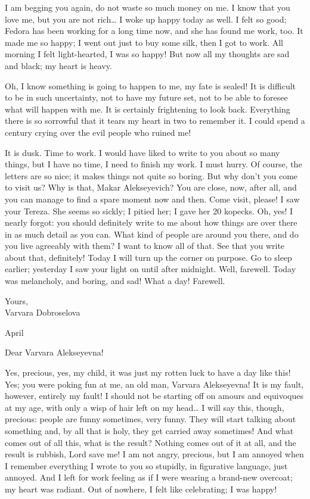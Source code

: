 I am begging you again, do not waste so much money on me. I know that you love me, but you are not rich\ldots{} I woke up happy today as well. I felt so good; Fedora has been working for a long time now, and she has found me work, too. It made me so happy; I went out just to buy some silk, then I got to work. All morning I felt light-hearted, I was so happy! But now all my thoughts are sad and black; my heart is heavy.

Oh, I know something is going to happen to me, my fate is sealed! It is difficult to be in such uncertainty, not to have my future set, not to be able to foresee what will happen with me. It is certainly frightening to look back. Everything there is so sorrowful that it tears my heart in two to remember it. I could spend a century crying over the evil people who ruined me!

It is dusk. Time to work. I would have liked to write to you about so many things, but I have no time, I need to finish my work. I must hurry. Of course, the letters are so nice; it makes things not quite so boring. But why don't you come to visit us? Why is that, Makar Alekseyevich? You are close, now, after all, and you can manage to find a spare moment now and then. Come visit, please! I saw your Tereza. She seems so sickly; I pitied her; I gave her 20 kopecks. Oh, yes! I nearly forgot: you should definitely write to me about how things are over there in as much detail as you can. What kind of people are around you there, and do you live agreeably with them? I want to know all of that. See that you write about that, definitely! Today I will turn up the corner on purpose. Go to sleep earlier; yesterday I saw your light on until after midnight. Well, farewell. Today was melancholy, and boring, and sad! What a day! Farewell.

\begin{flushright}
	Yours,\\
	Varvara Dobroselova
\end{flushright}

\begin{flushright}
	April 
\end{flushright}

\noindent Dear Varvara Alekseyevna!

Yes, precious, yes, my child, it was just my rotten luck to have a day like this! Yes; you were poking fun at me, an old man, Varvara Alekseyevna! It is my fault, however, entirely my fault! I should not be starting off on amours and equivoques at my age, with only a wisp of hair left on my head\ldots{} I will say this, though, precious: people are funny sometimes, very funny. They will start talking about something and, by all that is holy, they get carried away sometimes! And what comes out of all this, what is the result? Nothing comes out of it at all, and the result is rubbish, Lord save me! I am not angry, precious, but I am annoyed when I remember everything I wrote to you so stupidly, in figurative language, just annoyed. And I left for work feeling as if I were wearing a brand-new overcoat; my heart was radiant. Out of nowhere, I felt like celebrating; I was happy! 